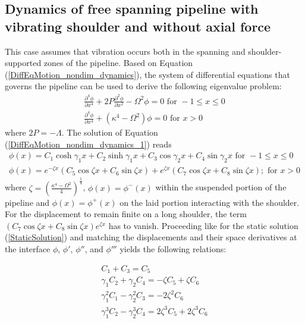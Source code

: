 \documentclass[3p,doublespacing,authoryear,11pt]{elsarticle} %
\begin{document}
\subsection{Dynamics of free spanning pipeline with vibrating shoulder and without axial force}
This case assumes that vibration occurs both in the spanning and shoulder-supported zones of the pipeline. Based on Equation (\ref{DiffEqMotion_nondim_dynamics}), the system of differential equations that governs the pipeline can be used to derive the following eigenvalue problem:  
 \begin{equation}\label{DiffEqMotion_nondim_dynamics_1}
 \begin{array}{l } 
\displaystyle  \frac{\partial^4 \phi}{\partial x^4} + 2P  \frac{\partial^2 \phi}{\partial x^2}  - \Omega^2 \phi  =  0  \text{ for } -1 \le x \le 0 \\
\displaystyle  \frac{\partial^4 \phi}{\partial x^4}   + (\kappa^4- \Omega^2) \phi  = 0 \text{ for } x > 0
  \end{array}  
\end{equation}
where $2P = -\Lambda$. The solution of Equation (\ref{DiffEqMotion_nondim_dynamics_1}) reads 
 \begin{equation}\label{SolutionDiffEqMotion_nondim_dynamics_1}
 \begin{array}{l } 
\displaystyle  \phi (x)= C_1 \cosh \gamma_1 x + C_2 \sinh \gamma_1 x + C_3 \cos \gamma_2 x + C_4 \sin \gamma_2 x  \text{ for } -1 \le x \le 0 \\
\displaystyle  \phi (x)= e^{-\zeta x}  \left(C_5 \cos \zeta x +  C_6 \sin \zeta x\right)  + e^{\zeta x}  \left(C_7 \cos \zeta x +  C_8 \sin \zeta x\right); \text{ for } x > 0
  \end{array}  
\end{equation}
where $\zeta = \left(\frac{\kappa^4 - \Omega^2}{4}\right)^{\frac{1}{4}}$, $\phi(x) =\phi^-(x)$ within the suspended portion of the pipeline and $\phi(x) =\phi^+(x)$ on the laid portion interacting with the shoulder. For the displacement to remain finite on a long shoulder, the term $ \left(C_7 \cos \zeta x +  C_8 \sin \zeta x\right)e^{\zeta x}$ has to vanish. Proceeding like for the static solution (\ref{StaticSolution}) and matching the displacements and their space derivatives at the interface $\phi$, $\phi'$, $\phi''$, and $\phi'''$ yields the following relations: 

\begin{equation}\label{Continuity_1}
 \begin{array}{l } 
\displaystyle   C_1 + C_3 = C_5\\
\displaystyle  \gamma_1 C_2 + \gamma_2 C_4 = -\zeta C_5 + \zeta C_6 \\
\displaystyle  \gamma_1^2 C_1 - \gamma_2^2 C_3 = -2 \zeta^2 C_6 \\
\displaystyle  \gamma_1^3 C_2 - \gamma_2^3 C_4 = 2\zeta^3 C_5 + 2\zeta^3 C_6 \\
  \end{array}  
\end{equation}
\end{document}
